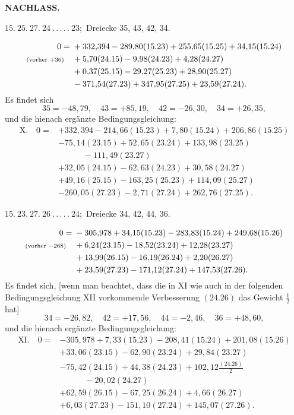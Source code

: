\newpage
{}\hfill\textbf{NACHLASS.}
\begin{center}
$15.\ 25.\ 27.\ 24\ .\,.\,.\,.\,.\ 23;$ Dreiecke 35, 43, 42, 34.
\end{center}
\[
\begin{aligned}
0={}&+332{,}394-289{,}80(15.23)+255{,}65(15.25)+34{,}15(15.24)\\
\text{\scriptsize(vorher $+36$)}\quad&+5{,}70(24.15)-9{,}98(24.23)+4{,}28(24.27)\\
&+0{,}37(25.15)-29{,}27(25.23)+28{,}90(25.27)\\
&-371{,}54(27.23)+347{,}95(27.25)+23{,}59(27.24).
\end{aligned}
\]
Es findet sich
\[
35=-48{,}79,\quad43=+85{,}19,\quad42=-26{,}30,\quad34=+26{,}35,
\]
und die hienach ergänzte Bedingungsgleichung:
\[
\begin{aligned}
\mathrm{X.}\quad0={}&+332{,}394-214{,}66(15.23)+7{,}80(15.24)+206{,}86(15.25)\\
&-75{,}14(23.15)+52{,}65(23.24)+133{,}98(23.25)\\
&\qquad\quad-111{,}49(23.27)\\
&+32{,}05(24.15)-62{,}63(24.23)+30{,}58(24.27)\\
&+49{,}16(25.15)-163{,}25(25.23)+114{,}09(25.27)\\
&-260{,}05(27.23)-2{,}71(27.24)+262{,}76(27.25).
\end{aligned}
\]

\par\bigskip
\begin{center}
$15.\ 23.\ 27.\ 26\ .\,.\,.\,.\,.\ 24;$ Dreiecke 34, 42, 44, 36.
\end{center}
\[
\begin{aligned}
0={}&-305{,}978+34{,}15(15.23)-283{,}83(15.24)+249{,}68(15.26)\\
\text{\scriptsize(vorher $-268$)}\quad&+6{,}24(23.15)-18{,}52(23.24)+12{,}28(23.27)\\
&+13{,}99(26.15)-16{,}19(26.24)+2{,}20(26.27)\\
&+23{,}59(27.23)-171{,}12(27.24)+147{,}53(27.26).
\end{aligned}
\]
Es findet sich, [wenn man beachtet, dass die in XI wie auch in der
folgenden Bedingungsgleichung XII vorkommende Verbesserung \((24.26)\) das
Gewicht \(\frac{1}{2}\) hat]
\[
34=-26{,}82,\quad42=+17{,}56,\quad44=-2{,}46,\quad36=+48{,}60,
\]
und die hienach ergänzte Bedingungsgleichung:
\[
\begin{aligned}
\mathrm{XI.}\quad0={}&-305{,}978+7{,}33(15.23)-208{,}41(15.24)+201{,}08(15.26)\\
&+33{,}06(23.15)-62{,}90(23.24)+29{,}84(23.27)\\
&-75{,}42(24.15)+44{,}38(24.23)+102{,}12\frac{(24.26)}{2}\\
&\qquad\quad-20{,}02(24.27)\\
&+62{,}59(26.15)-67{,}25(26.24)+4{,}66(26.27)\\
&+6{,}03(27.23)-151{,}10(27.24)+145{,}07(27.26).
\end{aligned}
\]

